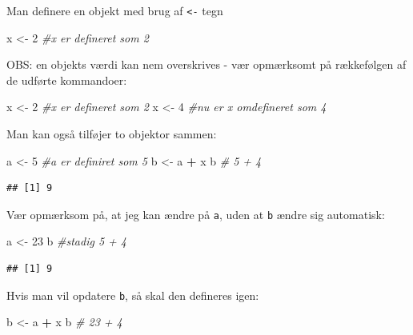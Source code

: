 \documentclass[
]{book}
\newenvironment{Shaded}{\begin{snugshade}}{\end{snugshade}}
\newcommand{\CommentTok}[1]{\textcolor[rgb]{0.56,0.35,0.01}{\textit{#1}}}
\newcommand{\DecValTok}[1]{\textcolor[rgb]{0.00,0.00,0.81}{#1}}
\newcommand{\NormalTok}[1]{#1}
\newcommand{\OtherTok}[1]{\textcolor[rgb]{0.56,0.35,0.01}{#1}}
\newcommand{\SpecialCharTok}[1]{\textcolor[rgb]{0.81,0.36,0.00}{\textbf{#1}}}
\begin{document}
Man definere en objekt med brug af \texttt{\textless{}-} tegn

\begin{Shaded}
\begin{Highlighting}[]
\NormalTok{x }\OtherTok{\textless{}{-}} \DecValTok{2} \CommentTok{\#x er defineret som 2}
\end{Highlighting}
\end{Shaded}

OBS: en objekts værdi kan nem overskrives - vær opmærksomt på rækkefølgen af de udførte kommandoer:

\begin{Shaded}
\begin{Highlighting}[]
\NormalTok{x }\OtherTok{\textless{}{-}} \DecValTok{2} \CommentTok{\#x er defineret som 2}
\NormalTok{x }\OtherTok{\textless{}{-}} \DecValTok{4} \CommentTok{\#nu er x omdefineret som 4}
\end{Highlighting}
\end{Shaded}

Man kan også tilføjer to objektor sammen:

\begin{Shaded}
\begin{Highlighting}[]
\NormalTok{a }\OtherTok{\textless{}{-}} \DecValTok{5} \CommentTok{\#a er definiret som 5}
\NormalTok{b }\OtherTok{\textless{}{-}}\NormalTok{ a }\SpecialCharTok{+}\NormalTok{ x}
\NormalTok{b }\CommentTok{\# 5 + 4}
\end{Highlighting}
\end{Shaded}

\begin{verbatim}
## [1] 9
\end{verbatim}

Vær opmærksom på, at jeg kan ændre på \texttt{a}, uden at \texttt{b} ændre sig automatisk:

\begin{Shaded}
\begin{Highlighting}[]
\NormalTok{a }\OtherTok{\textless{}{-}} \DecValTok{23}
\NormalTok{b }\CommentTok{\#stadig 5 + 4}
\end{Highlighting}
\end{Shaded}

\begin{verbatim}
## [1] 9
\end{verbatim}

Hvis man vil opdatere \texttt{b}, så skal den defineres igen:

\begin{Shaded}
\begin{Highlighting}[]
\NormalTok{b }\OtherTok{\textless{}{-}}\NormalTok{ a }\SpecialCharTok{+}\NormalTok{ x}
\NormalTok{b }\CommentTok{\# 23 + 4}
\end{Highlighting}
\end{Shaded}
\end{document}
